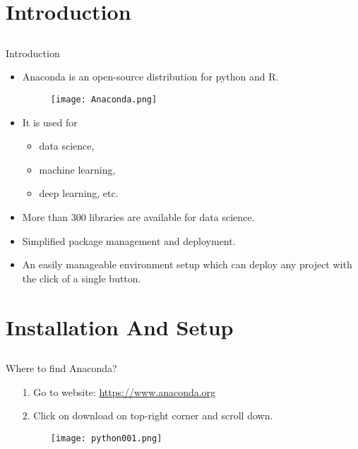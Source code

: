 \section{Introduction}
\subsection{}
\begin{frame}{Introduction}
\begin{itemize}
\item Anaconda is an open-source distribution for python and R.
\begin{figure}
\texttt{[image: Anaconda.png]}
\end{figure}
\item It is used for 
\begin{itemize}
\item data science, 
\item machine learning, 
\item deep learning, etc. 
\end{itemize}
\item More than 300 libraries are available for data science.
\item Simplified package management and deployment.
\item An easily manageable environment setup which can deploy any project with the click of a single button.
\end{itemize}
\end{frame}

\section{Installation And Setup}
\subsection{}

\begin{frame}{Where to find Anaconda?}
\begin{itemize}
\item[1.] Go to website: {\color{blue}\url{https://www.anaconda.org}}
\item[2.] Click on download on top-right corner and scroll down.
\begin{figure}
\texttt{[image: python001.png]}
\end{figure}
\end{itemize}
\end{frame}



